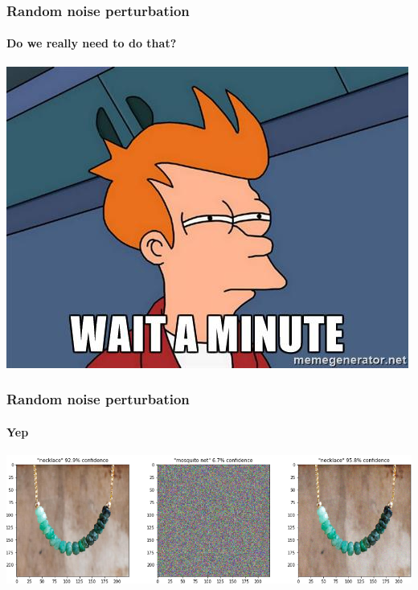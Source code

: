 \documentclass[9pt]{beamer}
\begin{document}
\begin{frame}
  \frametitle{Random noise perturbation}

  \framesubtitle{Do we really need to do that?}

  \begin{center}
    \includegraphics[width = 0.7 \linewidth]{images/wait-a-minute.jpg}
  \end{center}
\end{frame}

\begin{frame}
  \frametitle{Random noise perturbation}

  \framesubtitle{Yep}

  \begin{center}
    \includegraphics[width = \linewidth]{images/random_perturbation.png}
  \end{center}

\end{frame}
\end{document}
